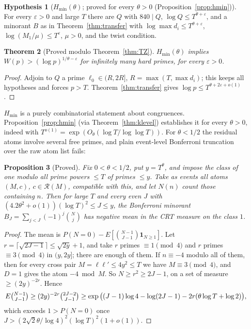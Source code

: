 \documentclass[11pt,reqno]{amsart}
\newtheorem{theorem}{Theorem}[section]
\newtheorem{proposition}[theorem]{Proposition}
\theoremstyle{definition}
\newtheorem{hypothesis}[theorem]{Hypothesis}
\newcommand{\cR}{\mathcal R}
\begin{document}
\begin{hypothesis}[$H_{\min}(\theta)$; proved for every $\theta>0$ \textup{(}Proposition~\ref{prop:hmin}\textup{)}]\label{hyp:min}
For every $\varepsilon>0$ and large $T$ there are $Q$ with $840\mid Q$,
$\log Q\le T^{\theta+\varepsilon}$, and a minorant $B$ as in
Theorem~\ref{thm:transfer} with $\log\max d_i\le T^{\theta+\varepsilon}$,
$\log(M_1/\mu)\le T^{\varepsilon}$, $\mu>0$, and the twist condition.
\end{hypothesis}

\begin{theorem}[Proved modulo Theorem~\ref{thm:TZ}]\label{thm:Hmin}
$H_{\min}(\theta)$ implies $W(p)>(\log p)^{1/\theta-\varepsilon}$ for infinitely
many hard primes, for every $\varepsilon>0$.
\end{theorem}

\begin{proof}
Adjoin to $Q$ a prime $\ell_0\in(R,2R]$, $R=\max(T,\max d_i)$; this keeps all
hypotheses and forces $p>T$.  Theorem~\ref{thm:transfer} gives
$\log p\le T^{\theta+2\varepsilon+o(1)}$.
\end{proof}

$H_{\min}$ is a purely combinatorial statement about congruences.
Proposition~\ref{prop:hmin} (via Theorem~\ref{thm:klevel}) establishes it for
every $\theta>0$, indeed with $T^{o(1)}=\exp(O_\theta(\log T/\log\log T))$.  For
$\theta<1/2$ the residual atoms involve several free primes, and plain
event-level Bonferroni truncation over the raw atom list fails:

\begin{proposition}[Proved]\label{prop:bonf}
Fix $0<\theta<1/2$, put $y=T^\theta$, and impose the class of one modulo all
prime powers $\le T$ of primes $\le y$.  Take as events all atoms
$(M,c)$, $c\in\cR(M)$, compatible with this, and let $N(n)$ count those
containing $n$.  Then for large $T$ and every even $J$ with
$(4.2\theta^2+o(1))(\log T)^2\le J\le y$, the Bonferroni minorant
$B_J=\sum_{j<J}(-1)^j\binom Nj$ has negative mean in the CRT measure on the
class $1$.
\end{proposition}

\begin{proof}
The mean is $P(N=0)-E[\binom{N-1}{J-1}\mathbf 1_{N\ge1}]$.  Let
$r=\lceil\sqrt{2J-1}\rceil\le\sqrt{2y}+1$, and take $r$ primes $\equiv1\pmod4$
and $r$ primes $\equiv3\pmod4$ in $(y,2y]$; there are enough of them.  If
$n\equiv-4$ modulo all of them, then for every cross pair $M=\ell\ell'\le4y^2\le T$
we have $M\equiv3\pmod 4$, and $D=1$ gives the atom $-4\bmod M$.  So
$N\ge r^2\ge2J-1$, on a set of measure $\ge(2y)^{-2r}$.  Hence
\[
 E\tbinom{N-1}{J-1}\ge(2y)^{-2r}\tbinom{2J-2}{J-1}
 \ge\exp\big((J-1)\log4-\log(2J-1)-2r(\theta\log T+\log2)\big),
\]
which exceeds $1>P(N=0)$ once $J>(2\sqrt2\theta/\log4)^2(\log T)^2(1+o(1))$.
\end{proof}
\end{document}
